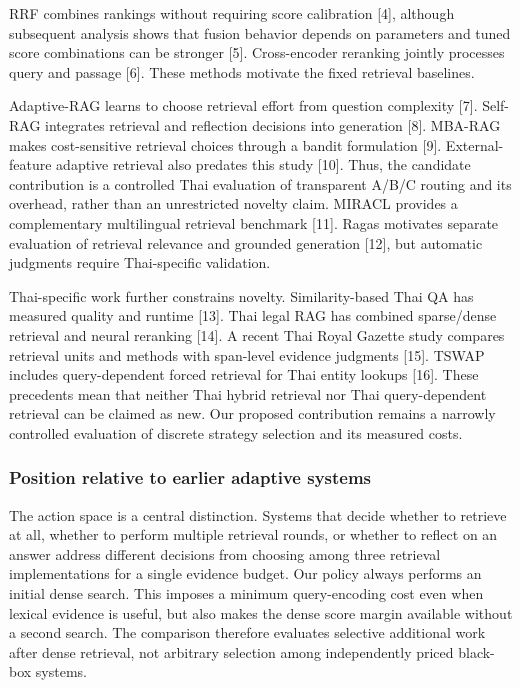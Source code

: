 \documentclass[10pt,a4paper]{article}
\begin{document}
RRF combines rankings without requiring score calibration [4],
although subsequent analysis shows that fusion behavior depends on
parameters and tuned score combinations can be stronger [5].
Cross-encoder reranking jointly processes query and passage
[6]. These methods motivate the fixed retrieval baselines.

Adaptive-RAG learns to choose retrieval effort from question complexity
[7]. Self-RAG integrates retrieval and reflection decisions
into generation [8]. MBA-RAG makes cost-sensitive retrieval
choices through a bandit formulation [9]. External-feature
adaptive retrieval also predates this study [10]. Thus, the
candidate contribution is a controlled Thai evaluation of transparent
A/B/C routing and its overhead, rather than an unrestricted novelty
claim. MIRACL provides a complementary multilingual retrieval benchmark
[11]. Ragas motivates separate evaluation of retrieval
relevance and grounded generation [12], but automatic judgments
require Thai-specific validation.

Thai-specific work further constrains novelty. Similarity-based Thai QA
has measured quality and runtime [13]. Thai legal RAG has
combined sparse/dense retrieval and neural reranking [14]. A
recent Thai Royal Gazette study compares retrieval units and methods
with span-level evidence judgments [15]. TSWAP includes
query-dependent forced retrieval for Thai entity lookups [16].
These precedents mean that neither Thai hybrid retrieval nor Thai
query-dependent retrieval can be claimed as new. Our proposed
contribution remains a narrowly controlled evaluation of discrete
strategy selection and its measured costs.

\hypertarget{position-relative-to-earlier-adaptive-systems}{%
\subsubsection{Position relative to earlier adaptive
systems}\label{position-relative-to-earlier-adaptive-systems}}

The action space is a central distinction. Systems that decide whether
to retrieve at all, whether to perform multiple retrieval rounds, or
whether to reflect on an answer address different decisions from
choosing among three retrieval implementations for a single evidence
budget. Our policy always performs an initial dense search. This imposes
a minimum query-encoding cost even when lexical evidence is useful, but
also makes the dense score margin available without a second search. The
comparison therefore evaluates selective additional work after dense
retrieval, not arbitrary selection among independently priced black-box
systems.
\end{document}

